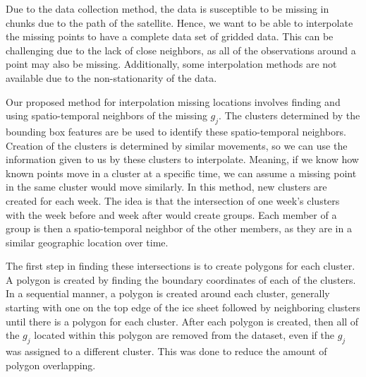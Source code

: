 \documentclass[12pt]{article}
\begin{document}
Due to the data collection method, the data is susceptible to be missing
in chunks due to the path of the satellite. Hence, we want to be able to
interpolate the missing points to have a complete data set of gridded
data. This can be challenging due to the lack of close neighbors, as all
of the observations around a point may also be missing. Additionally,
some interpolation methods are not available due to the non-stationarity
of the data.

Our proposed method for interpolation missing locations involves finding
and using spatio-temporal neighbors of the missing \(g_j\). The clusters
determined by the bounding box features are be used to identify these
spatio-temporal neighbors. Creation of the clusters is determined by
similar movements, so we can use the information given to us by these
clusters to interpolate. Meaning, if we know how known points move in a
cluster at a specific time, we can assume a missing point in the same
cluster would move similarly. In this method, new clusters are created
for each week. The idea is that the intersection of one week's clusters
with the week before and week after would create groups. Each member of
a group is then a spatio-temporal neighbor of the other members, as they
are in a similar geographic location over time.

The first step in finding these intersections is to create polygons for
each cluster. A polygon is created by finding the boundary coordinates
of each of the clusters. In a sequential manner, a polygon is created
around each cluster, generally starting with one on the top edge of the
ice sheet followed by neighboring clusters until there is a polygon for
each cluster. After each polygon is created, then all of the \(g_j\)
located within this polygon are removed from the dataset, even if the
\(g_j\) was assigned to a different cluster. This was done to reduce the
amount of polygon overlapping.
\end{document}
